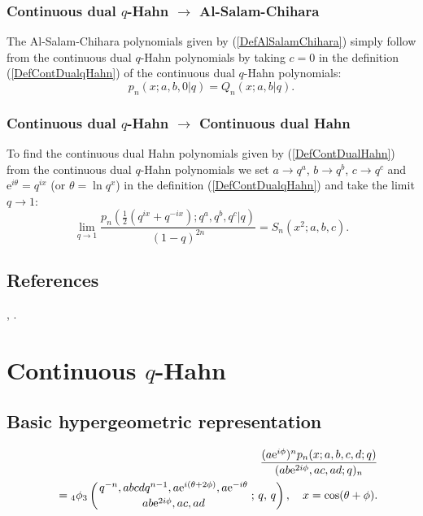 \documentclass[envcountchap,graybox]{svmono}
\newcounter{rom}
\newcommand{\qhyp}[5]{\mbox{}_{#1}{\phi}_{#2}
\left(\genfrac{}{}{0pt}{}{#3}{#4}\,;\,q,\,#5\right)}
\newcommand{\e}{\textrm{e}}
\begin{document}
\subsubsection*{Continuous dual $q$-Hahn $\rightarrow$ Al-Salam-Chihara}
The Al-Salam-Chihara polynomials given by (\ref{DefAlSalamChihara}) simply follow
from the continuous dual $q$-Hahn polynomials by taking $c=0$ in the
definition (\ref{DefContDualqHahn}) of the continuous dual $q$-Hahn polynomials:
\begin{equation}
p_n(x;a,b,0|q)=Q_n(x;a,b|q).
\end{equation}

\subsubsection*{Continuous dual $q$-Hahn $\rightarrow$ Continuous dual Hahn}
To find the continuous dual Hahn polynomials given by (\ref{DefContDualHahn})
from the continuous dual $q$-Hahn polynomials we set $a\rightarrow q^a$,
$b\rightarrow q^b$, $c\rightarrow q^c$ and $\e^{i\theta}=q^{ix}$
(or $\theta=\ln q^x$) in the definition (\ref{DefContDualqHahn}) and take the
limit $q\rightarrow 1$:
\begin{equation}
\lim_{q\rightarrow 1}\frac{p_n(\frac{1}{2}\left(q^{ix}+q^{-ix}\right);q^a,q^b,q^c|q)}{(1-q)^{2n}}=S_n(x^2;a,b,c).
\end{equation}

\subsection*{References}
\cite{AskeyRahmanSuslov}, \cite{Gupta96}.


\section{Continuous $q$-Hahn}
\par\setcounter{equation}{0}

\subsection*{Basic hypergeometric representation}
\begin{eqnarray}
\label{DefContqHahn}
& &\frac{(a\e^{i\phi})^np_n(x;a,b,c,d;q)}{(ab\e^{2i\phi},ac,ad;q)_n}\nonumber\\
& &{}=\qhyp{4}{3}{q^{-n},abcdq^{n-1},a\e^{i(\theta+2\phi)},a\e^{-i\theta}}
{ab\e^{2i\phi},ac,ad}{q},\quad x=\cos(\theta+\phi).
\end{eqnarray}
\end{document}
